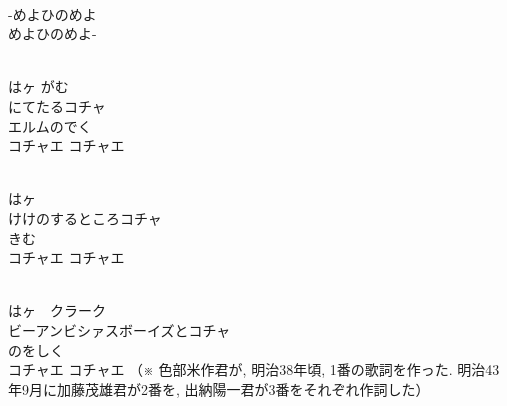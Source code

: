\documentclass[10pt,b5j]{tarticle} %
\begin{document}
\vspace{1.5em} %
\newcommand{\linespace}{0.5em} %
\newcommand{\blocksize}{0.5\hsize} %
\newcommand{\itemmargin}{6em} %
\begin{enumerate} %
    \setlength{\itemindent}{\itemmargin} %
    \begin{minipage}[c]{\blocksize}
    
        \vspace{\linespace}
        \item~\\
        -めよひのめよ\\
        めよひのめよ-
        
        \vspace{\linespace}
        \item~\\
        はヶ がむ\\
        にてたるコチャ\\
        エルムのでく\\
        コチャエ コチャエ
        
        \vspace{\linespace}
        \item~\\
        はヶ　\\
        けけのするところコチャ\\
        きむ\\
        コチャエ コチャエ
        
        \vspace{\linespace}
        \item~\\
        はヶ　クラーク\\
        ビーアンビシァスボーイズとコチャ\\
        のをしく\\
        コチャエ コチャエ
        （※
        色部米作君が, 明治38年頃, 
        1番の歌詞を作った. 
        明治43年9月に加藤茂雄君が2番を, 
        出納陽一君が3番をそれぞれ作詞した）
    
    \end{minipage}
\end{enumerate} %
\end{document}
